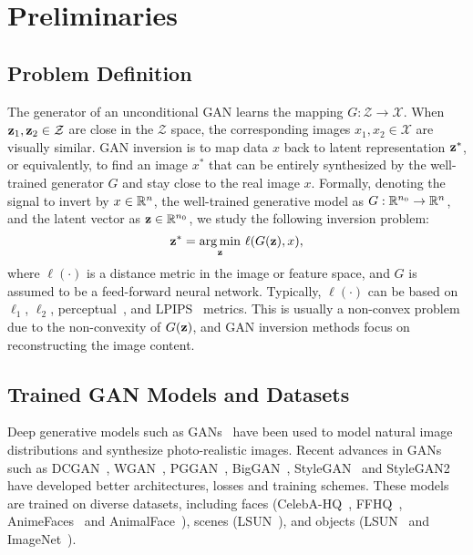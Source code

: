 \section{Preliminaries}
\label{sec:overview}

\subsection{Problem Definition}
\label{sec:definition}
The generator of an unconditional GAN learns the mapping $G: \mathcal{Z} \to \mathcal{X}$. 
When $\mathbf{z}_1, \mathbf{z}_2 \in \mathcal{Z}$ are close in the $\mathcal{Z}$ space, the corresponding images $x_1, x_2 \in \mathcal{X}$ are visually similar. 
GAN inversion is to map data $x$ back to latent representation $\mathbf{z}^*$, or equivalently, to find an image ${x^*}$ that can be entirely synthesized by the well-trained generator $G$ and stay close to the real image $x$.
Formally, denoting the signal to invert by $x \in \mathbb{R}^{n}$, the well-trained generative model as $G: \mathbb{R}^{n_{0}} \to \mathbb{R}^{n}$, and the latent vector as $\mathbf{z} \in \mathbb{R}^{n_{0}}$, we study the following inversion problem:
\begin{equation}
\z^*=\underset{\z}{\arg \min } \ \ell(G(\z), x),
\label{eqn:def}
\end{equation}
where $\ell(\cdot)$ is a distance metric in the image or feature space, and $G$ is assumed to be a feed-forward neural network. 
Typically, $\ell(\cdot)$ can be based on $\ell_1$, $\ell_2$, perceptual~\cite{johnson2016perceptual}, and LPIPS~\cite{zhang2018unreasonable} metrics.
This is usually a non-convex problem due to the non-convexity of $G(\mathbf{z})$, and GAN inversion methods focus on reconstructing the image content.

\subsection{Trained GAN Models and Datasets}
\label{sec:model_data}
Deep generative models such as GANs~\cite{goodfellow2014generative} have been used to model natural image distributions and synthesize photo-realistic images. Recent advances in GANs such as DCGAN~\cite{radford2016dcgan}, WGAN~\cite{gulrajani2017improved}, PGGAN~\cite{karras2017progressive}, BigGAN~\cite{brock2018large}, StyleGAN~\cite{karras2019style} and StyleGAN2~\cite{karras2020analyzing} have developed better architectures, losses and training schemes. These models are trained on diverse datasets, including faces (CelebA-HQ~\cite{karras2017progressive}, FFHQ~\cite{karras2019style,karras2020analyzing}, AnimeFaces~\cite{jin2017towards} and AnimalFace~\cite{liu2019funit}), scenes (LSUN~\cite{yu2015lsun}), and objects (LSUN~\cite{yu2015lsun} and ImageNet~\cite{russakovsky2015imagenet}).


